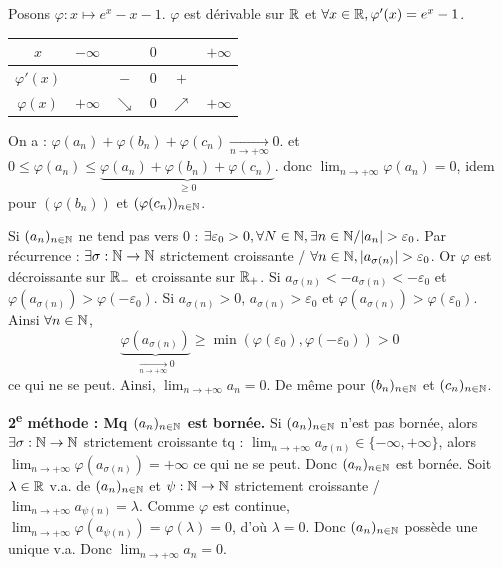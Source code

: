 \begin{solution}
Posons $\varphi : x \mapsto e^x - x - 1$.
$\varphi$ est dérivable sur $\mathbb R$ et $\forall x \in \mathbb R, \varphi'(x) = e^x - 1$.
\begin{center}
\begin{tabular}{|c|ccccc|}
\hline
$x$ & $-\infty$ & & $0$ & & $+\infty$ \\
\hline
$\varphi'(x)$ & & $-$ & $0$ & $+$ & \\
\hline
$\varphi(x)$ & $+\infty$ & $\searrow$ & $0$ & $\nearrow$ & $+\infty$ \\
\hline
\end{tabular}
\end{center}

On a : $\varphi(a_n) + \varphi(b_n) + \varphi(c_n) \xrightarrow[n \to +\infty]{} 0$.
et $0 \leq \varphi(a_n) \leq \underbrace{\varphi(a_n) + \varphi(b_n) + \varphi(c_n)}_{\geq 0}$.
donc $\lim_{n \to +\infty} \varphi(a_n) = 0$, idem pour $(\varphi(b_n))$ et $(\varphi(c_n))_{n \in \mathbb N}$.

Si $(a_n)_{n \in \mathbb N}$ ne tend pas vers 0 : $\exists \varepsilon_0 > 0, \forall N \in \mathbb N, \exists n \in \mathbb N / |a_n| > \varepsilon_0$.
Par récurrence : $\exists \sigma : \mathbb N \to \mathbb N$ strictement croissante / $\forall n \in \mathbb N, |a_{\sigma(n)}| > \varepsilon_0$.
Or $\varphi$ est décroissante sur $\mathbb R_-$ et croissante sur $\mathbb R_+$.
Si $a_{\sigma(n)} < -a_{\sigma(n)} < -\varepsilon_0$ et $\varphi(a_{\sigma(n)}) > \varphi(-\varepsilon_0)$.
Si $a_{\sigma(n)} > 0$, $a_{\sigma(n)} > \varepsilon_0$ et $\varphi(a_{\sigma(n)}) > \varphi(\varepsilon_0)$.
Ainsi $\forall n \in \mathbb N$,
\[
\underbrace{\varphi(a_{\sigma(n)})}_{\xrightarrow[n \to +\infty]{} 0} \geq \min(\varphi(\varepsilon_0), \varphi(-\varepsilon_0)) > 0
\]
ce qui ne se peut.
Ainsi, $\lim_{n \to +\infty} a_n = 0$. De même pour $(b_n)_{n \in \mathbb N}$ et $(c_n)_{n \in \mathbb N}$.

\textbf{2\textsuperscript{e} méthode : Mq $(a_n)_{n \in \mathbb N}$ est bornée.}
Si $(a_n)_{n \in \mathbb N}$ n'est pas bornée, alors $\exists \sigma : \mathbb N \to \mathbb N$ strictement croissante tq : $\lim_{n \to +\infty} a_{\sigma(n)} \in \{-\infty, +\infty\}$, alors $\lim_{n \to +\infty} \varphi(a_{\sigma(n)}) = +\infty$ ce qui ne se peut.
Donc $(a_n)_{n \in \mathbb N}$ est bornée.
Soit $\lambda \in \mathbb R$ v.a. de $(a_n)_{n \in \mathbb N}$ et $\psi : \mathbb N \to \mathbb N$ strictement croissante / $\lim_{n \to +\infty} a_{\psi(n)} = \lambda$.
Comme $\varphi$ est continue, $\lim_{n \to +\infty} \varphi(a_{\psi(n)}) = \varphi(\lambda) = 0$, d'où $\lambda = 0$.
Donc $(a_n)_{n \in \mathbb N}$ possède une unique v.a. Donc $\boxed{\lim_{n \to +\infty} a_n = 0}$.
\end{solution}

